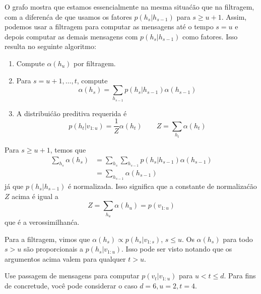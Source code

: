 \begin{exenumerate}
\begin{solution}
        O grafo mostra que estamos essencialmente na mesma situa\'c\~ao que
        na filtragem, com a diferen\'ca de que usamos os fatores
        $p(h_s|h_{s-1})$ para $s\ge u+1$. Assim, podemos usar a filtragem para computar
        as mensagens at\'e o tempo $s=u$ e depois computar as demais
        mensagens com $p(h_s|h_{s-1})$ como fatores. Isso resulta no
        seguinte algoritmo:
        \begin{enumerate}
            \item Compute $\alpha(h_u)$ por filtragem.
            \item Para $s=u+1, \ldots, t$, compute
            \begin{equation}
                \alpha(h_s) = \sum_{h_{s-1}} p(h_s|h_{s-1}) \alpha(h_{s-1})
            \end{equation}
            \item A distribui\'c\~ao preditiva requerida \'e
            \begin{equation}
                p(h_t | v_{1:u}) = \frac{1}{Z} \alpha(h_t) \quad \quad Z = \sum_{h_t} \alpha(h_t)
            \end{equation}
        \end{enumerate}
        Para $s \ge u+1$, temos que
        \begin{align}
            \sum_{h_s} \alpha(h_s) &= \sum_{h_s} \sum_{h_{s-1}} p(h_s|h_{s-1}) \alpha(h_{s-1})\\
            & =  \sum_{h_{s-1}} \alpha(h_{s-1})
        \end{align}
        j\'a que $p(h_s|h_{s-1})$ \'e normalizada. Isso significa que a constante de normaliza\'c\~ao $Z$ acima \'e igual a
        \begin{equation}
            Z = \sum_{h_u} \alpha(h_u) = p(v_{1:u})
        \end{equation}
        que \'e a verossimilhan\'ca.
        
        Para a filtragem, vimos que $\alpha(h_s) \propto
        p(h_s|v_{1:s})$, $s\le u$. Os $\alpha(h_s)$ para todo $s>u$ s\~ao
        proporcionais a $p(h_s| v_{1:u})$. Isso pode ser visto notando que
        os argumentos acima valem para qualquer $t>u$. 
    \end{solution}
    
    \item Use passagem de mensagens para computar $p(v_t|v_{1:u})$ para $u<t\le
    d$. Para fins de concretude, voc\^e pode considerar o caso $d=6,
    u=2, t=4$.
    

\end{exenumerate}
